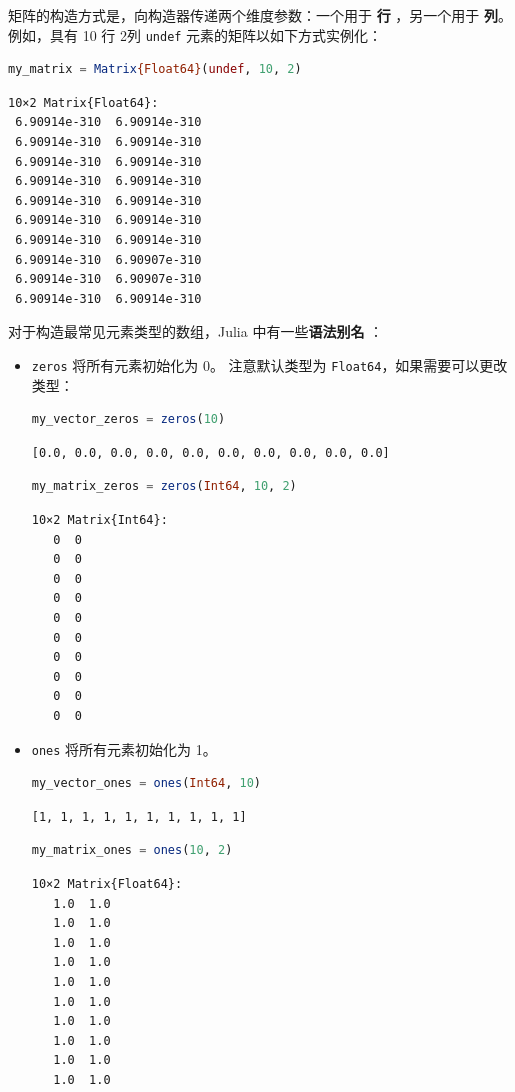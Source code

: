 \documentclass[
  notoc %
]{tufte-book}
\newcommand{\passthrough}[1]{#1}
\begin{document}
矩阵的构造方式是，向构造器传递两个维度参数：一个用于 \textbf{行}
，另一个用于 \textbf{列}。 例如，具有 10 行 2列
\passthrough{\lstinline!undef!} 元素的矩阵以如下方式实例化：

\begin{lstlisting}[language=Julia]
my_matrix = Matrix{Float64}(undef, 10, 2)
\end{lstlisting}

\begin{lstlisting}[language=Output]
10×2 Matrix{Float64}:
 6.90914e-310  6.90914e-310
 6.90914e-310  6.90914e-310
 6.90914e-310  6.90914e-310
 6.90914e-310  6.90914e-310
 6.90914e-310  6.90914e-310
 6.90914e-310  6.90914e-310
 6.90914e-310  6.90914e-310
 6.90914e-310  6.90907e-310
 6.90914e-310  6.90907e-310
 6.90914e-310  6.90914e-310
\end{lstlisting}

对于构造最常见元素类型的数组，Julia 中有一些\textbf{语法别名} ：

\begin{itemize}
\item
  \passthrough{\lstinline!zeros!} 将所有元素初始化为 0。 注意默认类型为
  \passthrough{\lstinline!Float64!}，如果需要可以更改类型：

  \begin{lstlisting}[language=Julia]
  my_vector_zeros = zeros(10)
  \end{lstlisting}

  \begin{lstlisting}[language=Output]
  [0.0, 0.0, 0.0, 0.0, 0.0, 0.0, 0.0, 0.0, 0.0, 0.0]
  \end{lstlisting}

  \begin{lstlisting}[language=Julia]
  my_matrix_zeros = zeros(Int64, 10, 2)
  \end{lstlisting}

  \begin{lstlisting}[language=Output]
  10×2 Matrix{Int64}:
   0  0
   0  0
   0  0
   0  0
   0  0
   0  0
   0  0
   0  0
   0  0
   0  0
  \end{lstlisting}
\item
  \passthrough{\lstinline!ones!} 将所有元素初始化为 1。

  \begin{lstlisting}[language=Julia]
  my_vector_ones = ones(Int64, 10)
  \end{lstlisting}

  \begin{lstlisting}[language=Output]
  [1, 1, 1, 1, 1, 1, 1, 1, 1, 1]
  \end{lstlisting}

  \begin{lstlisting}[language=Julia]
  my_matrix_ones = ones(10, 2)
  \end{lstlisting}

  \begin{lstlisting}[language=Output]
  10×2 Matrix{Float64}:
   1.0  1.0
   1.0  1.0
   1.0  1.0
   1.0  1.0
   1.0  1.0
   1.0  1.0
   1.0  1.0
   1.0  1.0
   1.0  1.0
   1.0  1.0
  \end{lstlisting}
\end{itemize}
\end{document}
